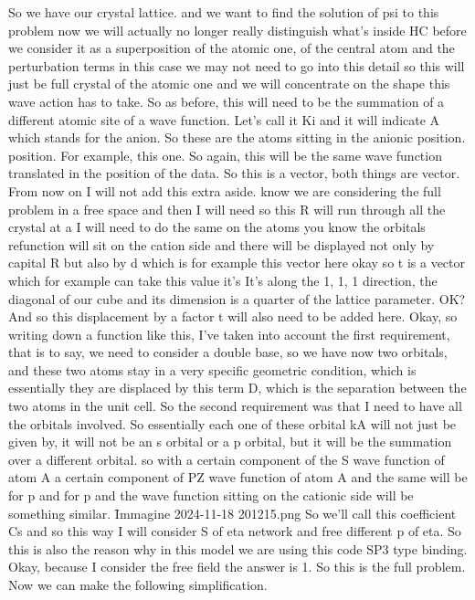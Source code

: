 So we have our crystal lattice. and we want to find the solution of psi to this problem now we will actually no longer really distinguish what's inside HC before we consider it as a superposition of the atomic one, of the central atom and the perturbation terms in this case we may not need to go into this detail so this will just be full crystal of the atomic one and we will concentrate on the shape this wave action has to take. So as before, this will need to be the summation of a different atomic site of a wave function. Let's call it Ki and it will indicate A which stands for the anion. So these are the atoms sitting in the anionic position. position. For example, this one. So again, this will be the same wave function translated in the position of the data. So this is a vector, both things are vector. From now on I will not add this extra aside. know we are considering the full problem in a free space and then I will need so this R will run through all the crystal at a I will need to do the same on the atoms you know the orbitals refunction will sit on the cation side and there will be displayed not only by capital R but also by d which is for example this vector here okay so t is a vector which for example can take this value it's It's along the 1, 1, 1 direction, the diagonal of our cube and its dimension is a quarter of the lattice parameter. OK? And so this displacement by a factor t will also need to be added here. Okay, so writing down a function like this, I've taken into account the first requirement, that is to say, we need to consider a double base, so we have now two orbitals, and these two atoms stay in a very specific geometric condition, which is essentially they are displaced by this term D, which is the separation between the two atoms in the unit cell. So the second requirement was that I need to have all the orbitals involved. So essentially each one of these orbital kA will not just be given by, it will not be an s orbital or a p orbital, but it will be the summation over a different orbital. so with a certain component of the S wave function of atom A a certain component of PZ wave function of atom A and the same will be for p and for p and the wave function sitting on the cationic side will be something similar.
\f{Immagine 2024-11-18 201215.png}
So we'll call this coefficient Cs and so this way I will consider S of eta network and free different p of eta. So this is also the reason why in this model we are using this code SP3 type binding. Okay, because I consider the free field the answer is 1. So this is the full problem. Now we can make the following simplification.
